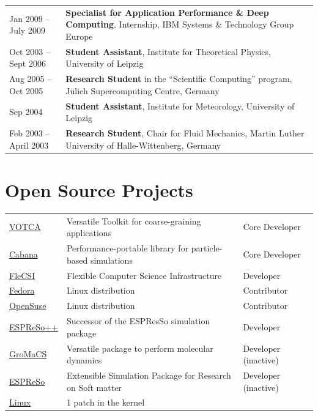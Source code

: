 \documentclass{article}
\begin{document}
\begin{longtable}{p{}p{}}
Jan 2009 -- July 2009 & \textbf{Specialist for Application Performance \& Deep Computing}, Internship, IBM Systems \& Technology Group Europe \\
Oct 2003 -- Sept 2006 & \textbf{Student Assistant}, Institute for Theoretical Physics, University of Leipzig \\
Aug 2005 -- Oct 2005 & \textbf{Research Student} in the ``Scientific Computing'' program, J{\"u}lich Supercomputing Centre, Germany \\
Sep 2004 & \textbf{Student Assistant}, Institute for Meteorology, University of Leipzig \\
Feb 2003 -- April 2003 & \textbf{Research Student}, Chair for Fluid Mechanics, Martin Luther University of Halle-Wittenberg, Germany \\
\end{longtable}

\section*{Open Source Projects}
\begin{tabular}{lll}
\href{http://www.votca.org}{VOTCA} & Versatile Toolkit for coarse-graining applications & Core Developer\\
\href{https://github.com/ECP-copa/Cabana}{Cabana} & Performance-portable library for particle-based simulations & Core Developer\\
\href{http://www.flecsi.org}{FleCSI} & Flexible Computer Science Infrastructure & Developer\\
\href{https://start.fedoraproject.org}{Fedora} & Linux distribution & Contributor \\
\href{https://en.opensuse.org}{OpenSuse} & Linux distribution & Contributor \\
\href{http://www.espresso-pp.de}{ESPReSo++} & Successor of the ESPResSo simulation package & Developer\\
\href{http://www.gromacs.org}{GroMaCS} & Versatile package to perform molecular dynamics & Developer (inactive)\\
\href{http://www.espressomd.org}{ESPReSo} & Extensible Simulation Package for Research on Soft matter & Developer (inactive)\\
\href{https://github.com/torvalds/linux/commit/7636bda61aacbef955c7f0088f7c3cb0875dc4a9}{Linux} & 1 patch in the kernel & \\
\end{tabular}\\
\end{document}
